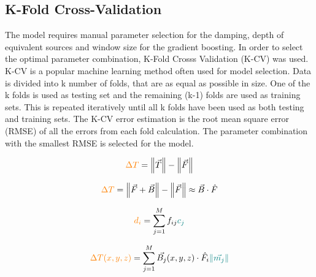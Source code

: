 \subsection{K-Fold Cross-Validation}
The model requires manual parameter selection for the damping, depth of equivalent sources and window size for the gradient boosting. In order to select the optimal parameter combination, K-Fold Crosss Validation (K-CV) was used. K-CV is a popular machine learning method often used for model selection. Data is divided into k number of folds, that are as equal as possible in size. One of the k folds is used as testing set and the remaining (k-1) folds are used as training sets. This is repeated iteratively until all k folds have been used as both testing and training sets. The K-CV error estimation is the root mean square error (RMSE) of all the errors from each fold calculation. The parameter combination with the smallest RMSE is selected for the model.



\begin{equation}
    \textcolor{orange}{\Delta T} = \left\lVert \vec{T} \right\rVert - \left\lVert \vec{F} \right\rVert
\end{equation}

\begin{equation}
    \textcolor{orange}{\Delta T} = \left\lVert \vec{F} + \vec{B} \right\rVert - \left\lVert \vec{F} \right\rVert \approx  \vec{B} \cdot \hat{F}
\end{equation}

\begin{equation}
\textcolor{orange}{d_i} = \sum_{j=1}^{M}  f_{ij} \textcolor{teal}{c_j}
\end{equation}

\begin{equation}
\textcolor{orange}{\Delta T (x, y, z)} = \sum_{j=1}^{M}  \vec{B_j}(x, y, z) \cdot \hat{F_i} \textcolor{teal}{\left\lVert \vec{m_j} \right\rVert}
\end{equation}

